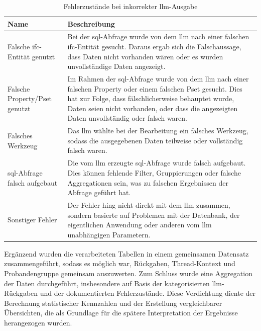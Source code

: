 \begin{table}[!htb]
    \centering
    \caption[\gls{llm}-Fehlerzustände bei Datenaufbereitung]{Fehlerzustände bei inkorrekter \gls{llm}-Ausgabe}
    \label{tab:103_incorrect-output-errors}
    \begin{tabular}{C{4cm} L{9cm}}
        \hline
        \textbf{Name} & \textbf{Beschreibung}\\
        \hline

        Falsche \gls{ifc}-Entität genutzt & Bei der \gls{sql}-Abfrage wurde von dem \gls{llm} nach einer falschen \gls{ifc}-Entität gesucht. 
        Daraus ergab sich die Falschaussage, dass Daten nicht vorhanden wären oder es wurden unvollständige Daten angezeigt. \\

        Falsche Property/Pset genutzt & Im Rahmen der \gls{sql}-Abfrage wurde von dem \gls{llm} nach einer falschen Property oder einem falschen Pset gesucht. 
        Dies hat zur Folge, dass fälschlicherweise behauptet wurde, Daten seien nicht vorhanden, oder dass die angezeigten Daten unvollständig oder falsch waren. \\

        Falsches Werkzeug & Das \gls{llm} wählte bei der Bearbeitung ein falsches Werkzeug, sodass die ausgegebenen Daten teilweise oder vollständig falsch waren. \\

        \gls{sql}-Abfrage falsch aufgebaut & Die vom \gls{llm} erzeugte \gls{sql}-Abfrage wurde falsch aufgebaut. Dies können fehlende Filter, Gruppierungen oder falsche Aggregationen sein,
        was zu falschen Ergebnissen der Abfrage geführt hat. \\

        Sonstiger Fehler & Der Fehler hing nicht direkt mit dem \gls{llm} zusammen, sondern basierte auf Problemen mit der Datenbank, der eigentlichen Anwendung oder anderen vom \gls{llm} unabhängigen Parametern. \\

        \hline
    \end{tabular}
\end{table}

Ergänzend wurden die verarbeiteten Tabellen in einem gemeinsamen Datensatz zusammengeführt, sodass es möglich war, Rückgaben, Thread-Kontext und Probandengruppe gemeinsam auszuwerten.
Zum Schluss wurde eine Aggregation der Daten durchgeführt, insbesondere auf Basis der kategorisierten \gls{llm}-Rückgaben und der dokumentierten Fehlerzustände.
Diese Verdichtung diente der Berechnung statistischer Kennzahlen und der Erstellung vergleichbarer Übersichten, die als Grundlage für die spätere Interpretation der Ergebnisse herangezogen wurden.